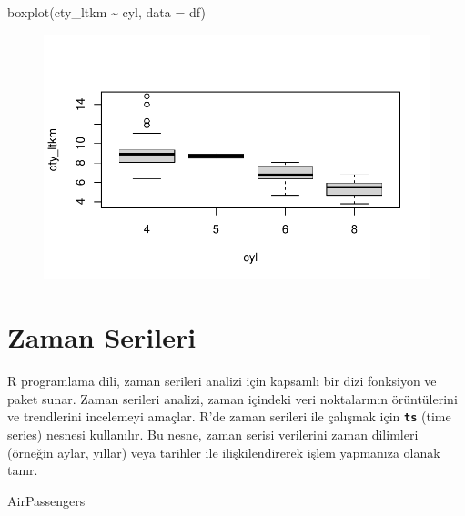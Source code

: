 \documentclass[
  letterpaper,
  DIV=11,
  numbers=noendperiod]{scrreprt}
\newenvironment{Shaded}{\begin{snugshade}}{\end{snugshade}}
\newcommand{\AttributeTok}[1]{\textcolor[rgb]{0.40,0.45,0.13}{#1}}
\newcommand{\FunctionTok}[1]{\textcolor[rgb]{0.28,0.35,0.67}{#1}}
\newcommand{\NormalTok}[1]{\textcolor[rgb]{0.00,0.23,0.31}{#1}}
\newcommand{\SpecialCharTok}[1]{\textcolor[rgb]{0.37,0.37,0.37}{#1}}
\begin{document}
\begin{Shaded}
\begin{Highlighting}[]
\FunctionTok{boxplot}\NormalTok{(cty\_ltkm }\SpecialCharTok{\textasciitilde{}}\NormalTok{ cyl, }\AttributeTok{data =}\NormalTok{ df)}
\end{Highlighting}
\end{Shaded}

\begin{figure}[H]

{\centering \includegraphics{data_analysis_files/figure-pdf/unnamed-chunk-4-1.pdf}

}

\end{figure}

\hypertarget{zaman-serileri}{%
\section*{Zaman Serileri}\label{zaman-serileri}}


R programlama dili, zaman serileri analizi için kapsamlı bir dizi
fonksiyon ve paket sunar. Zaman serileri analizi, zaman içindeki veri
noktalarının örüntülerini ve trendlerini incelemeyi amaçlar. R'de zaman
serileri ile çalışmak için \textbf{\texttt{ts}} (time series) nesnesi
kullanılır. Bu nesne, zaman serisi verilerini zaman dilimleri (örneğin
aylar, yıllar) veya tarihler ile ilişkilendirerek işlem yapmanıza olanak
tanır.

\begin{Shaded}
\begin{Highlighting}[]
\NormalTok{AirPassengers}
\end{Highlighting}
\end{Shaded}
\end{document}
